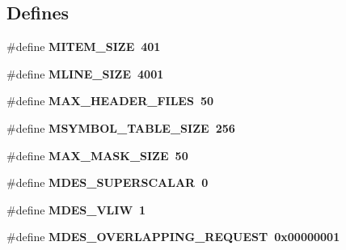 \subsection*{Defines}
\begin{CompactItemize}
\item 
\#define \bf{MITEM\_\-SIZE}~401
\item 
\#define \bf{MLINE\_\-SIZE}~4001
\item 
\#define \bf{MAX\_\-HEADER\_\-FILES}~50
\item 
\#define \bf{MSYMBOL\_\-TABLE\_\-SIZE}~256
\item 
\#define \bf{MAX\_\-MASK\_\-SIZE}~50
\item 
\#define \bf{MDES\_\-SUPERSCALAR}~0
\item 
\#define \bf{MDES\_\-VLIW}~1
\item 
\#define \bf{MDES\_\-OVERLAPPING\_\-REQUEST}~0x00000001
\end{CompactItemize}
